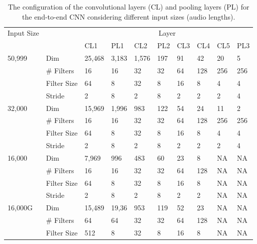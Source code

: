 \documentclass[preprint,final,12pt]{elsarticle}
\begin{document}
\begin{table*}[htpb!]
\centering
\footnotesize
\caption{The configuration of the convolutional layers (CL) and pooling layers (PL) for the end-to-end CNN considering different input sizes (audio lengths).} \begin{tabular}{llllllllll}
\hline\hline Input Size              &             & \multicolumn{8}{c}{Layer}                            \\ \cline{3-10}
                        &             & CL1    & PL1   & CL2   & PL2 & CL3 & CL4 & CL5 & PL3 \\ \hline
{50,999} & Dim         & 25,468 & 3,183 & 1,576 & 197 & 91  & 42  & 20  & 5   \\
                        & \# Filters  & 16     & 16    & 32    & 32  & 64  & 128 & 256 & 256 \\
                        & Filter Size & 64     & 8     & 32    & 8   & 16  & 8   & 4   & 4   \\
                        & Stride      & 2      & 8     & 2     & 8   & 2   & 2   & 2   & 4   \\ \hline
{32,000} & Dim         & 15,969 & 1,996 & 983   & 122 & 54  & 24  & 11  & 2   \\
                        & \# Filters  & 16     & 16    & 32    & 32  & 64  & 128 & 256 & 256 \\
                        & Filter Size & 64     & 8     & 32    & 8   & 16  & 8   & 4   & 4   \\
                        & Stride      & 2      & 8     & 2     & 8   & 2   & 2   & 2   & 4   \\ \hline
{16,000} & Dim         & 7,969  & 996   & 483   & 60  & 23  & 8   & NA & NA \\
                        & \# Filters  & 16     & 16    & 32    & 32  & 64  & 128 & NA & NA \\
                        & Filter Size & 64     & 8     & 32    & 8   & 16  & 8   & NA & NA \\
                        & Stride      & 2      & 8     & 2     & 8   & 2   & 2   & NA & NA \\ \hline
{16,000G} & Dim         & 15,489  & 19,36   & 953   & 119  & 52  & 23   & NA & NA \\
                        & \# Filters  & 64     & 64    & 32    & 32  & 64  & 128 & NA & NA \\
                        & Filter Size & 512     & 8     & 32    & 8   & 16  & 8   & NA & NA \\

\end{tabular}
\end{table*}
\end{document}
